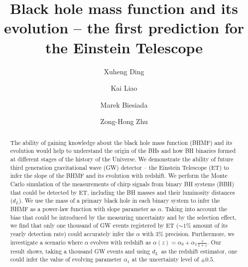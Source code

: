 \documentclass[twocolumn]{aastex62}
\begin{document}
\newcommand{\mbh}{$\mathcal M_{\rm BH}$}
\newcommand{\cmass}{${\cal M}_0$}
\newcommand{\dl}{$d_L$}
\newcommand{\mone}{$m_1$}
\newcommand{\mtwo}{$m_2$}
\newcommand{\snr}{$\rho$}

\title{Black hole mass function and its evolution -- the first prediction for the Einstein Telescope}


\author%
{Xuheng Ding}


\author%
{Kai Liao}

\author%
{Marek Biesiada}

\author%
{Zong-Hong Zhu}


\begin{abstract}
The ability of gaining knowledge about the  black hole mass function (BHMF) and its evolution would help to understand the origin of the BHs and how BH binaries formed at different stages of the history of the Universe. We demonstrate the ability of future third generation gravitational wave (GW) detector -- the Einstein Telescope (ET) to infer the slope of the BHMF and its evolution with redshift.  We perform the Monte Carlo simulation of the measurements of chirp signals from binary BH systems (BBH) that could be detected by ET, including the BH masses and their luminosity distances (\dl). We use the mass of a primary black hole in each binary system to infer the BHMF as a power-law function with slope parameter as $\alpha$. Taking into account the bias that could be introduced by the measuring uncertainty and by the selection effect, we find that only one thousand of GW events registered by ET ($\sim1\%$ amount of its yearly detection rate) could accurately infer the $\alpha$ with $3\%$ precision. Furthermore, we investigate a scenario where $\alpha$ evolves with redshift as $\alpha(z) = \alpha_0 + \alpha_1\frac{z}{1+z}$. Our result shows, taking a thousand GW events and using \dl\ as the redshift estimator, one could infer the value of evolving parameter $\alpha_1$ at the uncertainty level of $\pm0.5$.
\end{abstract}
\end{document}
